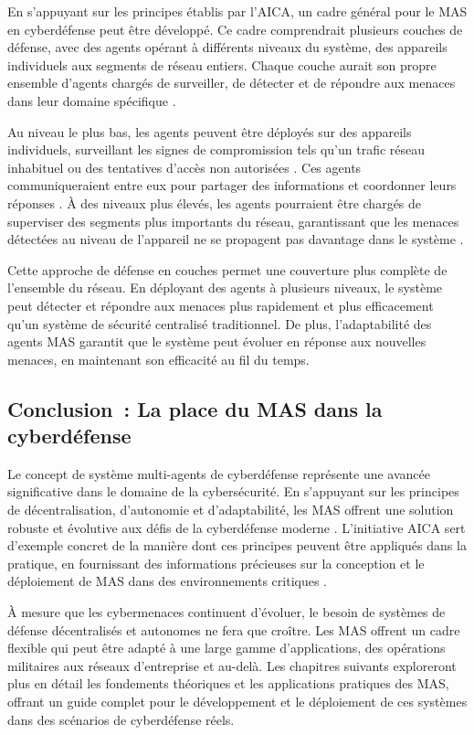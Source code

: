 En s'appuyant sur les principes établis par l'AICA, un cadre général pour le MAS en cyberdéfense peut être développé. Ce cadre comprendrait plusieurs couches de défense, avec des agents opérant à différents niveaux du système, des appareils individuels aux segments de réseau entiers. Chaque couche aurait son propre ensemble d'agents chargés de surveiller, de détecter et de répondre aux menaces dans leur domaine spécifique \cite{bou-harb2017cyber}.

Au niveau le plus bas, les agents peuvent être déployés sur des appareils individuels, surveillant les signes de compromission tels qu'un trafic réseau inhabituel ou des tentatives d'accès non autorisées \cite{kolias2011swarm}. Ces agents communiqueraient entre eux pour partager des informations et coordonner leurs réponses \cite{shamshirband2018computational}. À des niveaux plus élevés, les agents pourraient être chargés de superviser des segments plus importants du réseau, garantissant que les menaces détectées au niveau de l'appareil ne se propagent pas davantage dans le système \cite{hu2018mimic}.

Cette approche de défense en couches permet une couverture plus complète de l'ensemble du réseau. En déployant des agents à plusieurs niveaux, le système peut détecter et répondre aux menaces plus rapidement et plus efficacement qu'un système de sécurité centralisé traditionnel. De plus, l'adaptabilité des agents MAS garantit que le système peut évoluer en réponse aux nouvelles menaces, en maintenant son efficacité au fil du temps.

\subsection{Conclusion : La place du MAS dans la cyberdéfense}

Le concept de système multi-agents de cyberdéfense représente une avancée significative dans le domaine de la cybersécurité. En s'appuyant sur les principes de décentralisation, d'autonomie et d'adaptabilité, les MAS offrent une solution robuste et évolutive aux défis de la cyberdéfense moderne \cite{kolias2011swarm}. L'initiative AICA sert d'exemple concret de la manière dont ces principes peuvent être appliqués dans la pratique, en fournissant des informations précieuses sur la conception et le déploiement de MAS dans des environnements critiques \cite{bou-harb2014cyber}.

À mesure que les cybermenaces continuent d'évoluer, le besoin de systèmes de défense décentralisés et autonomes ne fera que croître. Les MAS offrent un cadre flexible qui peut être adapté à une large gamme d'applications, des opérations militaires aux réseaux d'entreprise et au-delà. Les chapitres suivants exploreront plus en détail les fondements théoriques et les applications pratiques des MAS, offrant un guide complet pour le développement et le déploiement de ces systèmes dans des scénarios de cyberdéfense réels.




